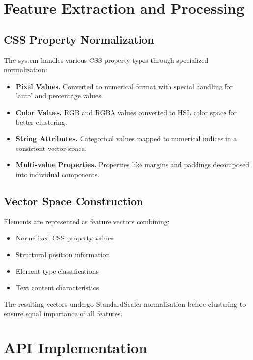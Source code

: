 \section{Feature Extraction and Processing}
\label{sec:feature_extraction}

\subsection{CSS Property Normalization}

The system handles various CSS property types through specialized normalization:

\begin{itemize}
\item \textbf{Pixel Values.} Converted to numerical format with special handling for 'auto' and percentage values.
\item \textbf{Color Values.} RGB and RGBA values converted to HSL color space for better clustering.
\item \textbf{String Attributes.} Categorical values mapped to numerical indices in a consistent vector space.
\item \textbf{Multi-value Properties.} Properties like margins and paddings decomposed into individual components.
\end{itemize}

\subsection{Vector Space Construction}

Elements are represented as feature vectors combining:

\begin{itemize}
\item Normalized CSS property values
\item Structural position information
\item Element type classifications
\item Text content characteristics
\end{itemize}

The resulting vectors undergo StandardScaler normalization before clustering to ensure equal importance of all features.

\section{API Implementation}
\label{sec:api_implementation}

